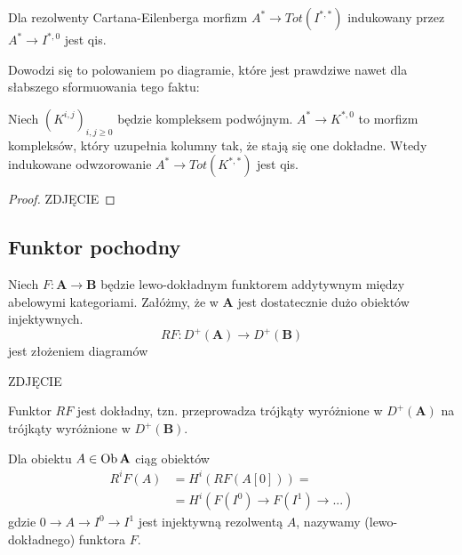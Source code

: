 \begin{fact}
  Dla rezolwenty Cartana-Eilenberga morfizm $A^*\to Tot(I^{*,*})$ indukowany przez $A^*\to I^{*,0}$ jest qis. 
\end{fact}

Dowodzi się to polowaniem po diagramie, które jest prawdziwe nawet dla słabszego sformuowania tego faktu:
\begin{lemma}
  Niech $(K^{i,j})_{i,j\geq 0}$ będzie kompleksem podwójnym. $A^*\to K^{*,0}$ to morfizm kompleksów, który uzupełnia kolumny tak, że stają się one dokładne. Wtedy indukowane odwzorowanie $A^*\to Tot(K^{*,*})$ jest qis.
\end{lemma}

\begin{proof}
  {\large\color{red}ZDJĘCIE}
\end{proof}

\subsection{Funktor pochodny}

\begin{definition}
  Niech $F:\mathbf{A}\to\mathbf{B}$ będzie lewo-dokładnym funktorem addytywnym między abelowymi kategoriami. Załóżmy, że w $\mathbf{A}$ jest dostatecznie dużo obiektów injektywnych. 
  $$RF:D^+(\mathbf{A})\to D^+(\mathbf{B})$$
  jest złożeniem diagramów
  \begin{center}\end{center}
  {\large\color{red}ZDJĘCIE}
\end{definition}

\begin{fact}
  Funktor $RF$ jest dokładny, tzn. przeprowadza trójkąty wyróżnione w $D^+(\mathbf{A})$ na trójkąty wyróżnione w $D^+(\mathbf{B})$.
\end{fact}

\begin{definition}
  Dla obiektu $A\in\operatorname{Ob}\mathbf{A}$ ciąg obiektów
  \begin{align*}
    R^iF(A)&=H^i(RF(A[0]))=\\ 
           &=H^i(F(I^0)\to F(I^1)\to ...)
  \end{align*}
  gdzie $0\to A\to I^0\to I^1$ jest injektywną rezolwentą $A$, nazywamy  (lewo-dokładnego) funktora $F$.
\end{definition}

